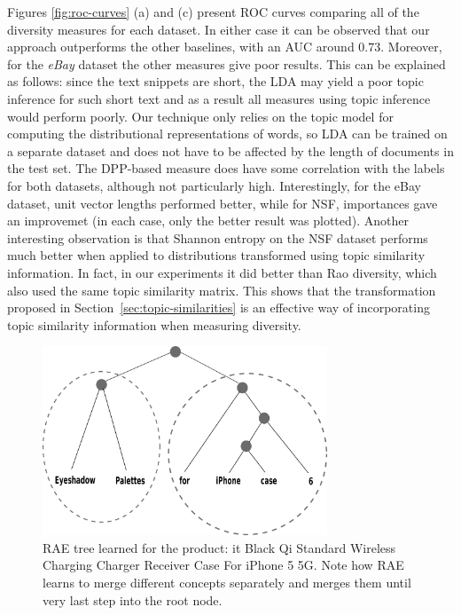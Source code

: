 Figures \ref{fig:roc-curves} (a) and (c)
present ROC curves comparing all of the diversity measures for each dataset.
In either case it can be observed
that our approach outperforms the other baselines, with an AUC
around $0.73$. Moreover, for the {\em eBay} dataset the other measures
give poor results. This can be explained as follows: since the
text snippets are short, the LDA may yield a poor topic inference for
such short text and as a result all measures using topic inference
would perform poorly. Our technique only relies on the topic model for
computing the distributional representations of words, so LDA can be
trained on a separate dataset and does not have to be affected by the
length of documents in the test set.
 The DPP-based measure does have some correlation
with the labels for both datasets, although not particularly
high. Interestingly, for the eBay dataset, unit vector lengths
performed better, while for NSF, importances gave an improvemet (in
each case, only the better result was
plotted). Another interesting observation is that 
Shannon entropy on the NSF dataset performs much better when applied
to distributions transformed using topic similarity information. In
fact, in our experiments it did better than Rao diversity, which also
used the same topic similarity matrix. This shows that the
transformation proposed in Section~\ref{sec:topic-similarities} is an
effective way of incorporating topic similarity information when
measuring diversity.
\begin{figure}
\begin{center}
\includegraphics[width=8.5cm]{figures/RAE-example.png}
\caption{RAE tree learned for the product: {it Black Qi Standard Wireless Charging Charger Receiver Case For iPhone 5 5G}. Note how RAE learns to merge different concepts separately and merges them until very last step into the root node.}
\end{center}
\label{fig:rae-example}
\end{figure}


